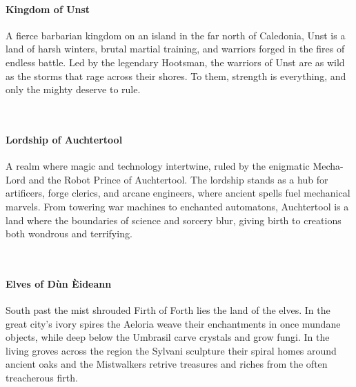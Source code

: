 {\entryfont\paragraph*{Kingdom of Unst} A fierce barbarian kingdom on an island in the far north of Caledonia, Unst is a land of harsh winters, brutal martial training, and warriors forged in the fires of endless battle. Led by the legendary Hootsman, the warriors of Unst are as wild as the storms that rage across their shores. To them, strength is everything, and only the mighty deserve to rule.}
\hfill\vspace*{-0.5\fontdimen6\font}\\
{\entryfont\paragraph*{Lordship of Auchtertool} A realm where magic and technology intertwine, ruled by the enigmatic Mecha-Lord and the Robot Prince of Auchtertool. The lordship stands as a hub for artificers, forge clerics, and arcane engineers, where ancient spells fuel mechanical marvels. From towering war machines to enchanted automatons, Auchtertool is a land where the boundaries of science and sorcery blur, giving birth to creations both wondrous and terrifying.}
\hfill\vspace*{-0.5\fontdimen6\font}\\
{\entryfont\paragraph*{Elves of Dùn Èideann} South past the mist shrouded Firth of Forth lies the land of the elves. In the great city's ivory spires the Aeloria weave their enchantments in once mundane objects, while deep below the Umbrasil carve crystals and grow fungi. In the living groves across the region the Sylvani sculpture their spiral homes around ancient oaks and the Mistwalkers retrive treasures and riches from the often treacherous firth.}

